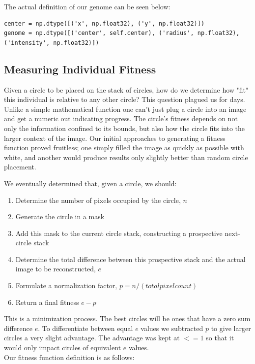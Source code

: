 \documentclass[12pt]{article}
\begin{document}
The actual definition of our genome can be seen below:
\begin{verbatim}
center = np.dtype([('x', np.float32), ('y', np.float32)])
genome = np.dtype([('center', self.center), ('radius', np.float32), ('intensity', np.float32)])
\end{verbatim}


\subsection{Measuring Individual Fitness}
Given a circle to be placed on the stack of circles, how do we determine how "fit" this individual is relative to any other circle? This question plagued us for days. Unlike a simple mathematical function one can't just plug a circle into an image and get a numeric out indicating progress. The circle's fitness depends on not only the information confined to its bounds, but also how the circle fits into the larger context of the image. Our initial approaches to generating a fitness function proved fruitless; one simply filled the image as quickly as possible with white, and another would produce results only slightly better than random circle placement. 

We eventually determined that, given a circle, we should:
\begin{enumerate}
\item Determine the number of pixels occupied by the circle, $n$
\item Generate the circle in a mask
\item Add this mask to the current circle stack, constructing  a prospective next-circle stack
\item Determine the total difference between this prospective stack and the actual image to be reconstructed, $e$
\item Formulate a normalization factor, $p = n/(total pixel count)$
\item Return a final fitness $e - p$
\end{enumerate}

This is a minimization process. The best circles will be ones that have a zero sum difference $e$. To differentiate between equal $e$ values we subtracted $p$ to give larger circles a very slight advantage. The advantage was kept at $<= 1$ so that it would only impact circles of equivalent $e$ values.
\\

Our fitness function definition is as follows:
\end{document}

